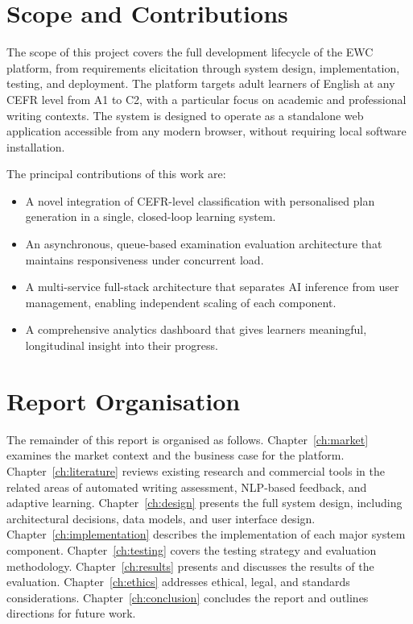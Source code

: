 \documentclass[12pt, a4paper]{report}
\begin{document}
\section{Scope and Contributions}

The scope of this project covers the full development lifecycle of the EWC platform, from requirements elicitation through system design, implementation, testing, and deployment. The platform targets adult learners of English at any CEFR level from A1 to C2, with a particular focus on academic and professional writing contexts. The system is designed to operate as a standalone web application accessible from any modern browser, without requiring local software installation.

The principal contributions of this work are:

\begin{itemize}
    \item A novel integration of CEFR-level classification with personalised plan generation in a single, closed-loop learning system.
    \item An asynchronous, queue-based examination evaluation architecture that maintains responsiveness under concurrent load.
    \item A multi-service full-stack architecture that separates AI inference from user management, enabling independent scaling of each component.
    \item A comprehensive analytics dashboard that gives learners meaningful, longitudinal insight into their progress.
\end{itemize}

\section{Report Organisation}

The remainder of this report is organised as follows. Chapter~\ref{ch:market} examines the market context and the business case for the platform. Chapter~\ref{ch:literature} reviews existing research and commercial tools in the related areas of automated writing assessment, NLP-based feedback, and adaptive learning. Chapter~\ref{ch:design} presents the full system design, including architectural decisions, data models, and user interface design. Chapter~\ref{ch:implementation} describes the implementation of each major system component. Chapter~\ref{ch:testing} covers the testing strategy and evaluation methodology. Chapter~\ref{ch:results} presents and discusses the results of the evaluation. Chapter~\ref{ch:ethics} addresses ethical, legal, and standards considerations. Chapter~\ref{ch:conclusion} concludes the report and outlines directions for future work.
\end{document}
